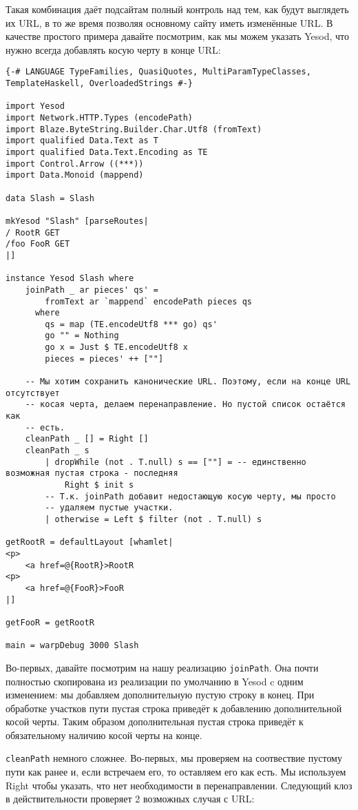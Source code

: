 Такая комбинация даёт подсайтам полный контроль над тем, как будут выглядеть их URL, в то же время позволяя основному сайту иметь изменённые URL. В качестве простого примера давайте посмотрим, как мы можем указать Yesod, что нужно всегда добавлять косую черту в конце URL:

\begin{lstlisting}
{-# LANGUAGE TypeFamilies, QuasiQuotes, MultiParamTypeClasses, TemplateHaskell, OverloadedStrings #-}

import Yesod
import Network.HTTP.Types (encodePath)
import Blaze.ByteString.Builder.Char.Utf8 (fromText)
import qualified Data.Text as T
import qualified Data.Text.Encoding as TE
import Control.Arrow ((***))
import Data.Monoid (mappend)

data Slash = Slash

mkYesod "Slash" [parseRoutes|
/ RootR GET
/foo FooR GET
|]

instance Yesod Slash where
    joinPath _ ar pieces' qs' =
        fromText ar `mappend` encodePath pieces qs
      where
        qs = map (TE.encodeUtf8 *** go) qs'
        go "" = Nothing
        go x = Just $ TE.encodeUtf8 x
        pieces = pieces' ++ [""]

    -- Мы хотим сохранить канонические URL. Поэтому, если на конце URL отсутствует
    -- косая черта, делаем перенаправление. Но пустой список остаётся как
    -- есть.
    cleanPath _ [] = Right []
    cleanPath _ s
        | dropWhile (not . T.null) s == [""] = -- единственно возможная пустая строка - последняя
            Right $ init s
        -- Т.к. joinPath добавит недостающую косую черту, мы просто
        -- удаляем пустые участки.
        | otherwise = Left $ filter (not . T.null) s

getRootR = defaultLayout [whamlet|
<p>
    <a href=@{RootR}>RootR
<p>
    <a href=@{FooR}>FooR
|]

getFooR = getRootR

main = warpDebug 3000 Slash
\end{lstlisting}%

Во-первых, давайте посмотрим на нашу реализацию \lstinline!joinPath!. Она почти полностью скопирована из реализации по умолчанию в Yesod c одним изменением: мы добавляем дополнительную пустую строку в конец. При обработке участков пути пустая строка приведёт к добавлению дополнительной косой черты. Таким образом дополнительная пустая строка приведёт к обязательному наличию косой черты на конце.

\lstinline!cleanPath! немного сложнее. Во-первых, мы проверяем на соотвествие пустому пути как ранее и, если встречаем его, то оставляем его как есть. Мы используем Right чтобы указать, что нет необходимости в перенаправлении. Следующий клоз в действительности проверяет 2 возможных случая с URL:

